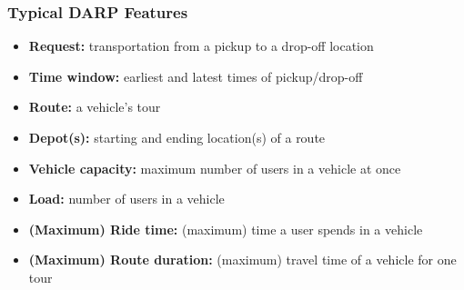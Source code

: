 \documentclass[aspectratio=1610]{beamer}
\let\oldfootnotesize\footnotesize
\renewcommand*{\footnotesize}{\oldfootnotesize\fontsize{6}{4}\selectfont}
\renewcommand{\footnotesize}{\scriptsize}
\begin{document}

\begin{frame}[noframenumbering]
	\frametitle{Typical DARP Features \footnotesize{\textcolor{gray}{\cite{Ho:2018}}}}

\begin{itemize}
	\item \textbf{Request:} transportation from a pickup to a drop-off location
	\item \textbf{Time window:} earliest and latest times of pickup/drop-off %
	\item \textbf{Route:} a vehicle's tour %
	\item \textbf{Depot(s):} starting and ending location(s) of a route 
	\item \textbf{Vehicle capacity:} maximum number of users in a vehicle at once
	\item \textbf{Load:} number of users in a vehicle
	\item \textbf{(Maximum) Ride time:} (maximum) time a user spends in a vehicle
	\item \textbf{(Maximum) Route duration:} (maximum) travel time of a vehicle for one tour
\end{itemize}
	
\end{frame}
\end{document}
